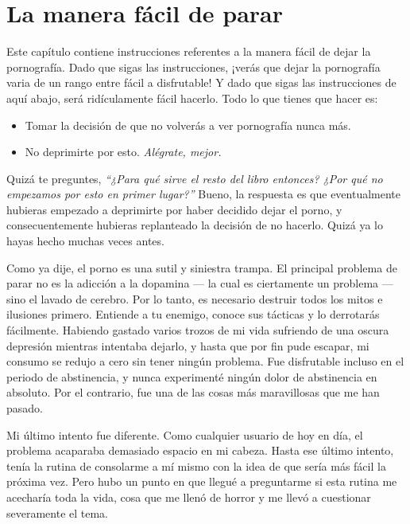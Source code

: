 \documentclass[
  openany]{book}
\providecommand{\tightlist}{%
  \setlength{\itemsep}{0pt}\setlength{\parskip}{0pt}}
\begin{document}
\hypertarget{la-manera-fuxe1cil-de-parar}{%
\chapter{La manera fácil de parar}\label{la-manera-fuxe1cil-de-parar}}

Este capítulo contiene instrucciones referentes a la manera fácil de dejar la pornografía. Dado que sigas las instrucciones, ¡verás que dejar la pornografía varia de un rango entre fácil a disfrutable! Y dado que sigas las instrucciones de aquí abajo, será ridículamente fácil hacerlo. Todo lo que tienes que hacer es:

\begin{itemize}
\tightlist
\item
  Tomar la decisión de que no volverás a ver pornografía nunca más.
\item
  No deprimirte por esto. \emph{Alégrate, mejor.}
\end{itemize}

Quizá te preguntes, \emph{``¿Para qué sirve el resto del libro entonces? ¿Por qué no empezamos por esto en primer lugar?''} Bueno, la respuesta es que eventualmente hubieras empezado a deprimirte por haber decidido dejar el porno, y consecuentemente hubieras replanteado la decisión de no hacerlo. Quizá ya lo hayas hecho muchas veces antes.

Como ya dije, el porno es una sutil y siniestra trampa. El principal problema de parar no es la adicción a la dopamina --- la cual es ciertamente un problema --- sino el lavado de cerebro. Por lo tanto, es necesario destruir todos los mitos e ilusiones primero. Entiende a tu enemigo, conoce sus tácticas y lo derrotarás fácilmente. Habiendo gastado varios trozos de mi vida sufriendo de una oscura depresión mientras intentaba dejarlo, y hasta que por fin pude escapar, mi consumo se redujo a cero sin tener ningún problema. Fue disfrutable incluso en el periodo de abstinencia, y nunca experimenté ningún dolor de abstinencia en absoluto. Por el contrario, fue una de las cosas más maravillosas que me han pasado.

Mi último intento fue diferente. Como cualquier usuario de hoy en día, el problema acaparaba demasiado espacio en mi cabeza. Hasta ese último intento, tenía la rutina de consolarme a mí mismo con la idea de que sería más fácil la próxima vez. Pero hubo un punto en que llegué a preguntarme si esta rutina me acecharía toda la vida, cosa que me llenó de horror y me llevó a cuestionar severamente el tema.
\end{document}
